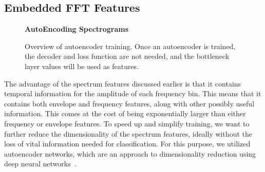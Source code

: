 \documentclass[\main/thesis.tex]{subfiles}
\begin{document}
\subsection{Embedded FFT Features}
\label{section:embedded_feats}
\begin{figure}[t!]
    \begin{center}
    \textbf{AutoEncoding Spectrograms}
    \end{center}
    \caption{Overview of autoencoder training. Once an autoencoder is trained, the decoder and loss function are not needed, and the bottleneck layer values will be used as features. }
\label{fig:autoencoder}
\end{figure}

% 
The advantage of the spectrum features discussed earlier is that it contains temporal information for the amplitude of each frequency bin. This means that it contains both envelope and frequency features, along with other possibly useful information. This comes at the cost of being exponentially larger than either frequency or envelope features. To speed up and simplify training, we want to further reduce the dimensionality of the spectrum features, ideally without the loss of vital information needed for classification. For this purpose, we utilized autoencoder networks, which are an approach to dimensionality reduction using deep neural networks~\cite{hinton1994autoencoders,hinton2006reducing}. 
\end{document}
